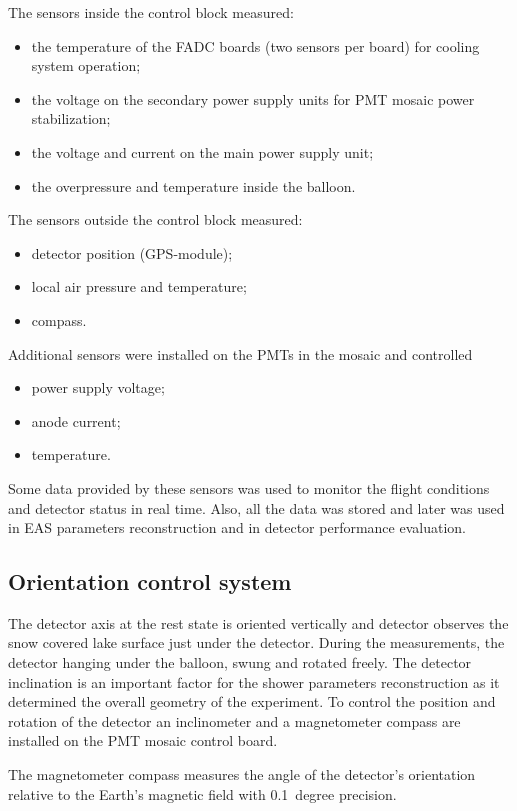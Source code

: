 \documentclass[final,5p,times,twocolumn]{elsarticle}
\begin{document}
The sensors inside the control block measured:
\begin{itemize}[nosep]
\item the temperature of the FADC boards (two sensors per board) for cooling system operation;
\item the voltage on the secondary power supply units for PMT mosaic power stabilization;
\item the voltage and current on the main power supply unit;
\item the overpressure and temperature inside the balloon.
\end{itemize}
The sensors outside the control block measured:
\begin{itemize}[nosep]
\item detector position (GPS-module);
\item local air pressure and temperature;
\item compass.
\end{itemize}
Additional sensors were installed on the PMTs in the mosaic and controlled
\begin{itemize}[nosep]
\item power supply voltage;
\item anode current;
\item temperature.
\end{itemize}

Some data provided by these sensors was used to monitor the flight conditions and detector status in real time. Also, all the data was stored and later was used in EAS parameters reconstruction and in detector performance evaluation.

\subsection{Orientation control system}
\label{sect:orientation}

The detector axis at the rest state is oriented vertically and detector observes the snow covered lake surface just under the detector. During the measurements, the detector hanging under the balloon, swung and rotated freely. The detector inclination is an important factor for the shower parameters reconstruction as it determined the overall geometry of the experiment. To control the position and rotation of the detector an inclinometer and a magnetometer compass are installed on the PMT mosaic control board. 

The magnetometer compass measures the angle of the detector's orientation relative to the Earth's magnetic field with 0.1~degree precision.
\end{document}
